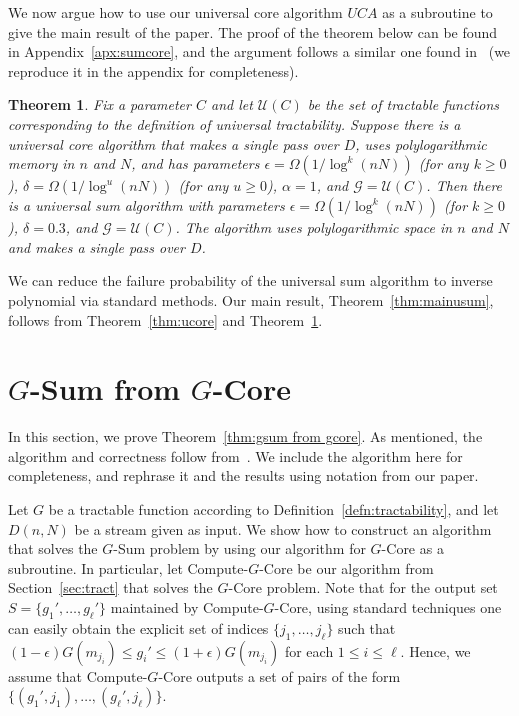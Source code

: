 \documentclass[11pt]{article}
\newtheorem{thm}{Theorem}
\begin{document}
We now argue how to use our universal core algorithm $UCA$ as a subroutine to give the main result
of the paper.  The proof of the theorem below can be found in Appendix~\ref{apx:sumcore}, and the argument
follows a similar one found in~\cite{BO13} (we reproduce it in the appendix for completeness).

\begin{thm}\label{thm:usum}
Fix a parameter $C$ and let $\mathcal{U}(C)$ be the set of tractable functions corresponding to the
definition of universal tractability.  Suppose there is a universal core algorithm that makes a single pass over
$D$, uses polylogarithmic memory in $n$ and $N$, and has parameters
$\epsilon = \Omega(1/\log^k(nN))$ (for any $k \geq 0$), $\delta = \Omega(1/\log^{u}(nN))$
(for any $u \geq 0$), $\alpha = 1$, and $\mathcal{G} = \mathcal{U}(C)$.  Then
there is a universal sum algorithm with parameters
$\epsilon = \Omega(1/\log^k(nN))$ (for $k \geq 0$), $\delta = 0.3$,
and $\mathcal{G} = \mathcal{U}(C)$.  The algorithm uses polylogarithmic space in $n$ and $N$ and makes a single
pass over $D$.
\end{thm}

\noindent We can reduce the failure probability of the universal sum algorithm to
inverse polynomial via standard methods.  Our main result, Theorem~\ref{thm:mainusum},
follows from Theorem~\ref{thm:ucore} and Theorem~\ref{thm:usum}.




\appendix


\section{$G$-Sum from $G$-Core}\label{apx:sum}
In this section, we prove Theorem~\ref{thm:gsum from gcore}.
As mentioned, the algorithm and correctness follow from~\cite{BO13}.  We include the algorithm
here for completeness, and rephrase it and the results using notation from our paper.

Let $G$ be a tractable function according to Definition~\ref{defn:tractability}, and let $D(n,N)$ be a stream given as input.
We show how to construct an algorithm that solves the $G$-Sum problem by using our algorithm for $G$-Core as
a subroutine.  In particular, let Compute-$G$-Core be our algorithm from Section~\ref{sec:tract} that solves
the $G$-Core problem.  Note that for the output set 
$S = \{g_1',\ldots,g_\ell'\}$ maintained by Compute-$G$-Core, using standard techniques one can easily obtain the explicit set
of indices $\{j_1,\ldots,j_{\ell}\}$ such that $(1-\epsilon)G(m_{j_i}) \leq g_i' \leq (1+\epsilon)G(m_{j_i})$
for each $1 \leq i \leq \ell$.  Hence, we assume that Compute-$G$-Core outputs a set of pairs of the form
$\{(g_1',j_1),\ldots,(g_\ell',j_\ell) \}$.
\end{document}
